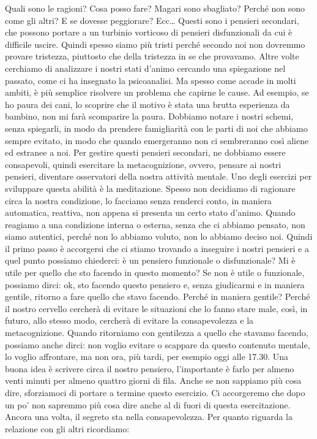 \documentclass[12pt]{book} %
\begin{document}
Quali sono le ragioni? Cosa posso fare? Magari sono sbagliato? Perché non sono come gli altri? E se dovesse peggiorare?
Ecc… Questi sono i pensieri secondari, che possono portare a un turbinio vorticoso di pensieri disfunzionali da cui è
difficile uscire. Quindi spesso siamo più tristi perché secondo noi non dovremmo provare tristezza, piuttosto che della
tristezza in se che provavamo. Altre volte cerchiamo di analizzare i nostri stati d'animo cercando
una spiegazione nel passato, come ci ha insegnato la psicoanalisi. Ma spesso come accade in molti ambiti, è più
semplice risolvere un problema che capirne le cause. Ad esempio, se ho paura dei cani, lo scoprire che il motivo è
stata una brutta esperienza da bambino, non mi farà scomparire la paura. Dobbiamo notare i nostri schemi, senza
spiegarli, in modo da prendere famigliarità con le parti di noi che abbiamo sempre evitato, in modo che quando
emergeranno non ci sembreranno così aliene ed estranee a noi. Per gestire questi pensieri secondari, ne dobbiamo essere
consapevoli, quindi esercitare la metacognizione, ovvero, pensare ai nostri pensieri, diventare osservatori della
nostra attività mentale. Uno degli esercizi per sviluppare questa abilità è la meditazione. Spesso non decidiamo di
ragionare circa la nostra condizione, lo facciamo senza renderci conto, in maniera automatica, reattiva, non appena si
presenta un certo stato d'animo. Quando reagiamo a una condizione interna o esterna, senza che ci
abbiamo pensato, non siamo autentici, perché non lo abbiamo voluto, non lo abbiamo deciso noi. Quindi il primo passo è
accorgersi che ci stiamo trovando a inseguire i nostri pensieri e a quel punto possiamo chiederci: è un pensiero
funzionale o disfunzionale? Mi è utile per quello che sto facendo in questo momento? Se non è utile o funzionale,
possiamo dirci: ok, sto facendo questo pensiero e, senza giudicarmi e in maniera gentile, ritorno a fare quello che
stavo facendo. Perché in maniera gentile? Perché il nostro cervello cercherà di evitare le situazioni che lo fanno
stare male, così, in futuro, allo stesso modo, cercherà di evitare la consapevolezza e la metacognizione. Quando
ritorniamo con gentilezza a quello che stavamo facendo, possiamo anche dirci: non voglio evitare o scappare da questo
contenuto mentale, lo voglio affrontare, ma non ora, più tardi, per esempio oggi alle 17.30. Una buona idea è scrivere
circa il nostro pensiero, l'importante è farlo per almeno venti minuti per almeno quattro giorni
di fila. Anche se non sappiamo più cosa dire, sforziamoci di portare a termine questo esercizio. Ci accorgeremo che
dopo un po' non sapremmo più cosa dire anche al di fuori di questa esercitazione. Ancora una volta, il segreto sta
nella consapevolezza. Per quanto riguarda la relazione con gli altri ricordiamo:
\end{document}

